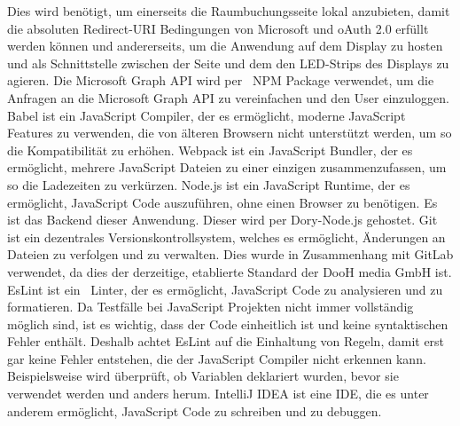 Dies wird benötigt, um einerseits die Raumbuchungsseite lokal anzubieten, damit die absoluten Redirect-URI Bedingungen von Microsoft und oAuth 2.0 erfüllt werden können und andererseits, um die Anwendung auf dem Display zu hosten und als Schnittstelle zwischen der Seite und dem den LED-Strips des Displays zu agieren.
\newline
\newline
{}
Die Microsoft Graph API wird per ~\gls{NPM} Package verwendet, um die Anfragen an die Microsoft Graph API zu vereinfachen und den User einzuloggen.
\newline
\newline
Babel ist ein JavaScript Compiler, der es ermöglicht, moderne JavaScript Features zu verwenden, die von älteren Browsern nicht unterstützt werden, um so die Kompatibilität zu erhöhen.
\newline
\newline
Webpack ist ein JavaScript Bundler, der es ermöglicht, mehrere JavaScript Dateien zu einer einzigen zusammenzufassen, um so die Ladezeiten zu verkürzen.
\newline
\newline
Node.js ist ein JavaScript Runtime, der es ermöglicht, JavaScript Code auszuführen, ohne einen Browser zu benötigen.
Es ist das Backend dieser Anwendung.
Dieser wird per Dory-Node.js gehostet.
\newline
\newline
Git ist ein dezentrales Versionskontrollsystem, welches es ermöglicht, Änderungen an Dateien zu verfolgen und zu verwalten.
Dies wurde in Zusammenhang mit GitLab verwendet, da dies der derzeitige, etablierte Standard der DooH media GmbH ist.
\newline
\newline
{}
EsLint ist ein ~\gls{Linter}, der es ermöglicht, JavaScript Code zu analysieren und zu formatieren.
Da Testfälle bei JavaScript Projekten nicht immer vollständig möglich sind, ist es wichtig, dass der Code einheitlich ist und keine syntaktischen Fehler enthält.
Deshalb achtet EsLint auf die Einhaltung von Regeln, damit erst gar keine Fehler entstehen, die der JavaScript Compiler nicht erkennen kann.
Beispielsweise wird überprüft, ob Variablen deklariert wurden, bevor sie verwendet werden und anders herum.
\newline
\newline
IntelliJ IDEA ist eine IDE, die es unter anderem ermöglicht, JavaScript Code zu schreiben und zu debuggen.
\newline
\newline
